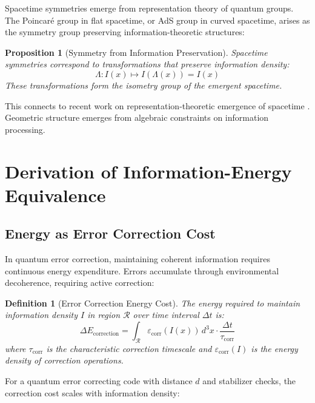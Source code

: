 \documentclass[12pt,a4paper]{article}
\newtheorem{definition}[theorem]{Definition}
\newtheorem{proposition}[theorem]{Proposition}
\theoremstyle{remark}
\begin{document}
Spacetime symmetries emerge from representation theory of quantum groups. The Poincaré group in flat spacetime, or AdS group in curved spacetime, arises as the symmetry group preserving information-theoretic structures:

\begin{proposition}[Symmetry from Information Preservation]
Spacetime symmetries correspond to transformations that preserve information density:
\begin{equation}
\Lambda: I(x) \mapsto I(\Lambda(x)) = I(x)
\end{equation}
These transformations form the isometry group of the emergent spacetime.
\end{proposition}

This connects to recent work on representation-theoretic emergence of spacetime \cite{Cao2017}. Geometric structure emerges from algebraic constraints on information processing.

\section{Derivation of Information-Energy Equivalence}
\label{sec:derivation}

\subsection{Energy as Error Correction Cost}

In quantum error correction, maintaining coherent information requires continuous energy expenditure. Errors accumulate through environmental decoherence, requiring active correction:

\begin{definition}[Error Correction Energy Cost]
The energy required to maintain information density $I$ in region $\mathcal{R}$ over time interval $\Delta t$ is:
\begin{equation}
\Delta E_{\text{correction}} = \int_{\mathcal{R}} \varepsilon_{\text{corr}}(I(x)) \, d^3x \cdot \frac{\Delta t}{\tau_{\text{corr}}}
\end{equation}
where $\tau_{\text{corr}}$ is the characteristic correction timescale and $\varepsilon_{\text{corr}}(I)$ is the energy density of correction operations.
\end{definition}

For a quantum error correcting code with distance $d$ and stabilizer checks, the correction cost scales with information density:
\end{document}
